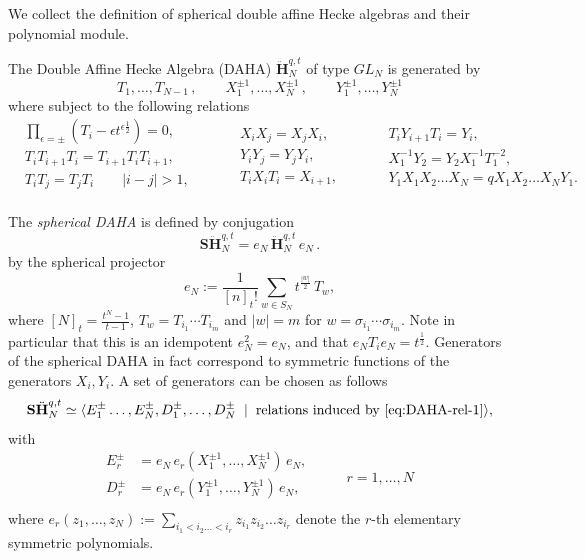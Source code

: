 \documentclass{article}
\numberwithin{equation}{section}
\def\be{\begin{equation}}
\def\ee{\end{equation}}
\newcommand{\SH}{{\mathbf{S}\ddot{\mathbf{H}}}}
\renewcommand{\H}{{{\mathbf{H}}}}
\begin{document}
We collect the definition of spherical double affine Hecke algebras and their polynomial module.

The Double Affine Hecke Algebra (DAHA) $\ddot \H_N^{q,t}$ of type $GL_N$ is generated by
\be
	T_1,\dots, T_{N-1}\,,
	\qquad
	X_1^{\pm 1},\dots, X_N^{\pm 1}\,,
	\qquad 
	Y_1^{\pm 1},\dots, Y_N^{\pm 1}
\ee
where subject to the following relations
\be\label{eq:DAHA-rel-1}
\begin{split}
	&\prod_{\epsilon = \pm}(T_i- \epsilon t^{\epsilon \frac{1}{2}}) = 0 ,\\
	&T_i T_{i+1} T_i = T_{i+1} T_i T_{i+1}  ,\\
	&T_i T_{j} = T_{j} T_i  \qquad |i-j| > 1,  \\
\end{split}
\qquad
\begin{split}
&X_i X_j = X_j X_i, 
\\& Y_i Y_j = Y_j Y_i, 
\\
&T_i X_i T_i = X_{i+1}, 
\end{split}
\qquad
\begin{split}
&T_i Y_{i+1} T_i = Y_{i}, 
\\&X_1^{-1}Y_2 = Y_2 X_1^{-1}T_1^{-2},
\\&Y_1 X_1 X_2 \dots X_N = q X_1 X_2 \dots X_N Y_1 .
\end{split}
\ee


The \textit{spherical DAHA} is defined by conjugation 
\be\label{eq:SHn-def}
	\SH_N^{q,t}= e_N \, \ddot \H_N^{q,t}\, e_N\,.
\ee
by the spherical projector
\be\label{eq:symmetric-idempotent}
	e_N := \frac{ 1}{ [n]_{t}!}\sum_{w \in S_N} t^{\frac{|w|}{2}} \, T_w,
\ee
where $[N]_t  = \frac{t^N-1}{t-1}$, $T_w = T_{i_1}\cdots T_{i_m}$ and $|w| = m$ for $w = \sigma_{i_1}\cdots \sigma_{i_m}$. Note in particular that this is an idempotent $e_N^2 = e_N$, and that $e_N T_i e_N = t^{\frac{1}{2}}$. 
Generators of the spherical DAHA in fact correspond to symmetric functions of the generators $X_i, Y_i$. A set of generators can be chosen as follows \cite{schiffmann2013elliptic, cherednik2005double}
\be\label{eq:SHn-generators}
	\SH_N^{q,t} \simeq \langle E_1^{\pm}\dots, E^{\pm}_N , D^{\pm}_1,\dots, D^{\pm}_N \hspace{0.2cm} | \hspace{0.2cm} \text{relations induced by \eqref{eq:DAHA-rel-1}}\rangle,
\ee
with
\be\label{eq:SHn-generators-expressions}
\begin{split}
	E_r^\pm & = e_N\, e_r(X_1^{\pm 1},\dots, X_N^{\pm 1})\, e_N, \\
	D_r^\pm & = e_N\, e_r(Y_1^{\pm 1},\dots, Y_N^{\pm 1})\, e_N, \\
\end{split}	
\qquad
\begin{split}
	r=1,\dots, N
\end{split}	
\ee
where $e_r(z_1, \dots, z_N):=  \sum_{{i_1}<i_2\dots< i_r} z_{i_1}z_{i_2}\dots z_{i_r} $ denote the $r$-th elementary symmetric polynomials.
\end{document}

